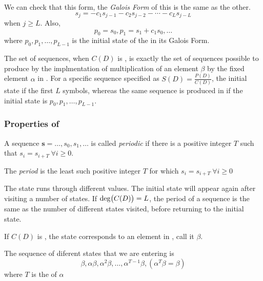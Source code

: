 We can check that this form, the \emph{Galois Form} of this  is the same as the other.
\begin{equation*}
  s_{j} = -c_{1}s_{j-1} - c_{2}s_{j-2} - \cdots - c_{L}s_{j-L}
\end{equation*}
when $j \geq L$.
Also,
\begin{equation*}
  p_{0} = s_{0}, p_{1} = s_{1} + c_{1}s_{0}, \ldots
\end{equation*}
where $p_{0}, p_{1}, \ldots, p_{L-1}$ is the initial state of the  in its Galois Form.

\begin{blackbox}
  The set of  sequences, when $C(D)$ is , is exactly the set of sequences possible to produce by the implmentation of multiplication of an element $\beta$ by the fixed element $\alpha$ in .
  \tcblower{}
  For a specific sequence specified as $S(D) = \frac{P(D)}{C(D)}$, the initial state if the first $L$ symbols, whereas the same sequence is produced in  if the initial state is $p_{0}, p_{1}, \ldots, p_{L-1}$.
\end{blackbox}

\subsubsection{Properties of }\label{subsubsec:LFSR_Properties}
\begin{propertylist}
\item A sequence $\mathbf{s} = \ldots, s_{0}, s_{1}, \ldots$ is called \emph{periodic} if there is a positive integer $T$ such that $s_{i} = s_{i+T} \: \forall i \geq 0$.
\item The \emph{period} is the least such positive integer $T$ for which $s_{i} = s_{i+T} \: \forall i \geq 0$
\item The  state runs through different values. The initial state will appear again after visiting a number of states.
  If $\operatorname{\operatorname{deg}} \bigl( C(D) \bigr) = L$, the period of a sequence is the same as the number of different states visited, before returning to the initial state.
\item If $C(D)$ is , the state corresponds to an element in , call it $\beta$.
\item The sequence of diferent states that we are entering is
  \begin{equation*}
    \beta, \alpha\beta, \alpha^{2}\beta , \ldots, \alpha^{T-1}\beta, \left( \alpha^{T}\beta = \beta \right)
  \end{equation*}
  where $T$ is the  of $\alpha$
\end{propertylist}


